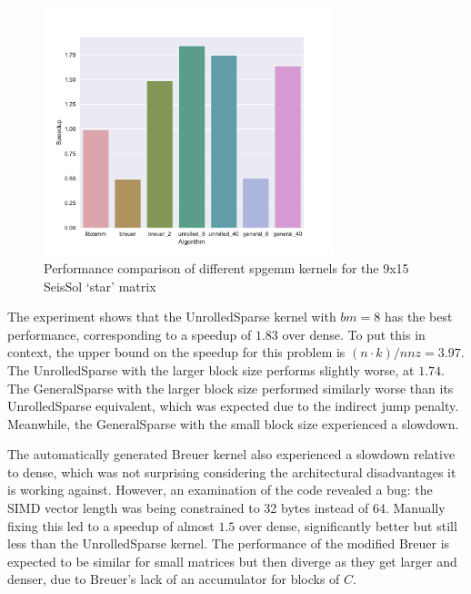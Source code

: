   \begin{figure}[!htb]
    \centering
      \includegraphics[width=0.75\textwidth]{images/seissol_comparison.pdf}
      \caption{Performance comparison of different spgemm kernels for the 9x15 SeisSol `star' matrix}
      \label{fig:perf_seissol}
  \end{figure}


The experiment shows that the UnrolledSparse kernel with $bm=8$ has the best performance, corresponding to a speedup of $1.83$ over dense. To put this in context, the upper bound on the speedup for this problem is $(n\cdot k)/nnz = 3.97$. The UnrolledSparse with the larger block size performs slightly worse, at $1.74$. The GeneralSparse with the larger block size performed similarly worse than its UnrolledSparse equivalent, which was expected due to the indirect jump penalty. Meanwhile, the GeneralSparse with the small block size experienced a slowdown. 

The automatically generated Breuer kernel also experienced a slowdown relative to dense, which was not surprising considering the architectural disadvantages it is working against. However, an examination of the code revealed a bug: the SIMD vector length was being constrained to 32 bytes instead of 64. Manually fixing this led to a speedup of almost $1.5$ over dense, significantly better but still less than the UnrolledSparse kernel. The performance of the modified Breuer is expected to be similar for small matrices but then diverge as they get larger and denser, due to Breuer's lack of an accumulator for blocks of $C$. 

